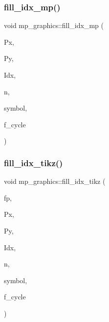 \subsubsection{\texorpdfstring{fill\+\_\+idx\+\_\+mp()}{fill\_idx\_mp()}}
{\footnotesize\ttfamily void mp\+\_\+graphics\+::fill\+\_\+idx\+\_\+mp (\begin{DoxyParamCaption}\item[{\mbox{\hyperlink{galois_8h_a09fddde158a3a20bd2dcadb609de11dc}{I\+NT}} $\ast$}]{Px,  }\item[{\mbox{\hyperlink{galois_8h_a09fddde158a3a20bd2dcadb609de11dc}{I\+NT}} $\ast$}]{Py,  }\item[{\mbox{\hyperlink{galois_8h_a09fddde158a3a20bd2dcadb609de11dc}{I\+NT}} $\ast$}]{Idx,  }\item[{\mbox{\hyperlink{galois_8h_a09fddde158a3a20bd2dcadb609de11dc}{I\+NT}}}]{n,  }\item[{const char $\ast$}]{symbol,  }\item[{\mbox{\hyperlink{galois_8h_a09fddde158a3a20bd2dcadb609de11dc}{I\+NT}}}]{f\+\_\+cycle }\end{DoxyParamCaption})}

\mbox{\label{classmp__graphics_a6d871b98a58914222b7ad34af1b699ca}} 
\subsubsection{\texorpdfstring{fill\+\_\+idx\+\_\+tikz()}{fill\_idx\_tikz()}}
{\footnotesize\ttfamily void mp\+\_\+graphics\+::fill\+\_\+idx\+\_\+tikz (\begin{DoxyParamCaption}\item[{ofstream \&}]{fp,  }\item[{\mbox{\hyperlink{galois_8h_a09fddde158a3a20bd2dcadb609de11dc}{I\+NT}} $\ast$}]{Px,  }\item[{\mbox{\hyperlink{galois_8h_a09fddde158a3a20bd2dcadb609de11dc}{I\+NT}} $\ast$}]{Py,  }\item[{\mbox{\hyperlink{galois_8h_a09fddde158a3a20bd2dcadb609de11dc}{I\+NT}} $\ast$}]{Idx,  }\item[{\mbox{\hyperlink{galois_8h_a09fddde158a3a20bd2dcadb609de11dc}{I\+NT}}}]{n,  }\item[{const char $\ast$}]{symbol,  }\item[{\mbox{\hyperlink{galois_8h_a09fddde158a3a20bd2dcadb609de11dc}{I\+NT}}}]{f\+\_\+cycle }\end{DoxyParamCaption})}

